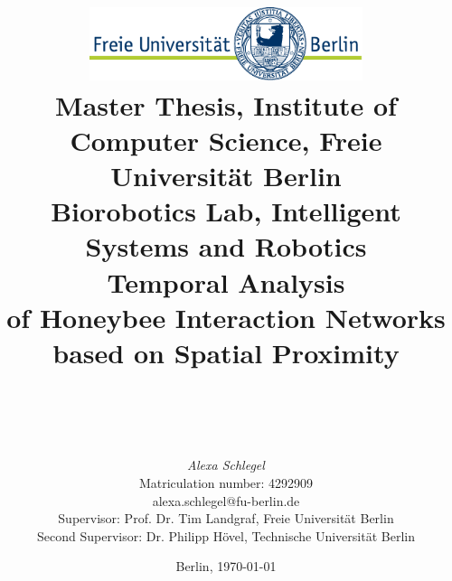 %
\begin{titlepage}

\title{\includegraphics[width=0.6\textwidth]{Resources/FU_logo.pdf}\\
{\small Master Thesis, Institute of Computer Science, Freie Universität Berlin}\\
{\small Biorobotics Lab, Intelligent Systems and Robotics}\\
[6ex]
{\LARGE Temporal Analysis\\ of Honeybee Interaction Networks\\}
{\normalsize based on Spatial Proximity\\ }
\vspace{2ex}
\\
}

\author{
{\emph{\normalsize Alexa Schlegel}}\\
{\normalsize Matriculation number: 4292909}\\
{\normalsize alexa.schlegel@fu-berlin.de}\\ 
[15ex]   
{\normalsize Supervisor: Prof. Dr. Tim Landgraf, Freie Universität Berlin}\\
{\normalsize Second Supervisor: Dr. Philipp Hövel, Technische Universität Berlin}\\
}
\vspace{6ex}
\date{\normalsize Berlin, \today}
 
\maketitle  


\end{titlepage}